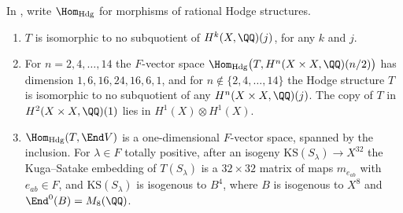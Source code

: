 \begin{proposition}\label{prop:mumfordwhere}
In , write $\Hom_{\mathrm{Hdg}}$ for morphisms of rational
Hodge structures.
\begin{enumerate}[label=\textup{(\roman*)},nosep,leftmargin=2.6em]
\item $T$ is isomorphic to no subquotient of $H^{k}(X,\QQ)(j)$, for any $k$
  and $j$.
\item For $n=2,4,\dots,14$ the $F$-vector space
  $\Hom_{\mathrm{Hdg}}\bigl(T,H^{n}(X\times X,\QQ)(n/2)\bigr)$ has dimension
  $1,6,16,24,16,6,1$, and for $n\notin\{2,4,\dots,14\}$ the Hodge structure
  $T$ is isomorphic to no subquotient of any $H^{n}(X\times X,\QQ)(j)$. The
  copy of $T$ in $H^{2}(X\times X,\QQ)(1)$ lies in $H^{1}(X)\otimes H^{1}(X)$.
\item $\Hom_{\mathrm{Hdg}}(T,\End V)$ is a one-dimensional $F$-vector space,
  spanned by the inclusion. For $\lambda\in F$ totally positive, after an
  isogeny $\mathrm{KS}(S_{\lambda})\to X^{32}$ the Kuga--Satake embedding of
  $T(S_{\lambda})$ is a $32\times32$ matrix of maps $m_{e_{ab}}$ with
  $e_{ab}\in F$, and $\mathrm{KS}(S_{\lambda})$ is isogenous to $B^{4}$, where
  $B$ is isogenous to $X^{8}$ and $\End^{0}(B)=M_{8}(\QQ)$.
\end{enumerate}
\end{proposition}

